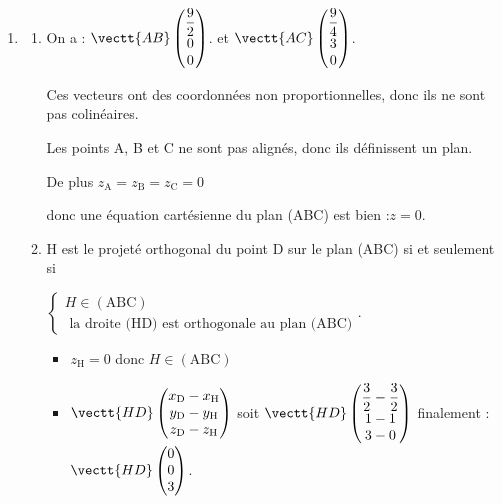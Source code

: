 \begin{enumerate}
\begin{enumerate}
			
			
			L'aire du triangle  ABC est bien égale à $\np[m^2]{6,75}$.
		\end{enumerate}

	\item \begin{enumerate}
		\item On a : $\vectt{AB} \begin{pmatrix} \dfrac{9}{2}\\0\\0\end{pmatrix} $.
		et  \quad $\vectt{AC} \begin{pmatrix}\dfrac{9}{4} \\ 3\\0 \end{pmatrix} $.
		
		Ces vecteurs ont des coordonnées non proportionnelles, donc ils ne sont pas colinéaires.
		
		Les points A, B et C ne sont pas alignés, donc ils définissent un plan.
		
		De plus $z_{\mathrm{A}}=z_{\mathrm{B}}=z_{\mathrm{C}}=0$ 
		
		
	donc une équation cartésienne du plan (ABC) est bien :\quad $z=0$.
		
		\item  H est le projeté orthogonal du point D sur le plan (ABC) si et seulement si 
		
		$\begin{cases}
			H \in (\mathrm{ABC})\\
			\text{ la droite (HD) est orthogonale au plan (ABC)} \end{cases}$. 
			
			\begin{itemize}
				\item $z_{\mathrm{H}}=0$  donc $H \in (\mathrm{ABC})$
				
				\item  	$\vectt{HD} \begin{pmatrix}
					x_{\mathrm{D}} - x_{\mathrm{H}}\\
					y_{\mathrm{D}} - y_{\mathrm{H}}\\
					z_{\mathrm{D}} - z_{\mathrm{H}} \end{pmatrix} $
				\quad soit \quad $\vectt{HD} \begin{pmatrix} \dfrac{3}{2}-\dfrac{3}{2}\\1-1\\3-0 \end{pmatrix} $
				\quad finalement :\quad $\vectt{HD} \begin{pmatrix} 0\\0\\3\end{pmatrix} $.
				

\end{itemize}
\end{enumerate}
\end{enumerate}
